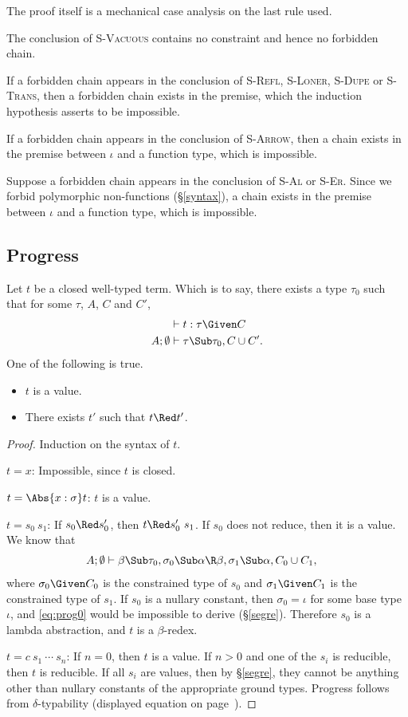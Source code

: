 \documentclass{amsart}
\theoremstyle{definition}
\begin{document}
The proof itself is a mechanical case analysis on the last rule
used.

The conclusion of \textsc{S-Vacuous} contains no constraint and
hence no forbidden chain.

If a forbidden chain appears in the conclusion of \textsc{S-Refl},
\textsc{S-Loner}, \textsc{S-Dupe} or \textsc{S-Trans}, then a
forbidden chain exists in the premise, which the induction
hypothesis asserts to be impossible.

If a forbidden chain appears
in the conclusion of \textsc{S-Arrow}, then a chain exists in the
premise between $\iota$ and a function type, which is impossible.

Suppose a forbidden chain appears in the conclusion of
\textsc{S-Al} or \textsc{S-Er}. Since we forbid polymorphic
non-functions (\S\ref{syntax}), a chain exists in the premise
between $\iota$ and a function type, which is impossible.

\subsection{Progress} Let $t$ be a closed well-typed term. Which
is to say, there exists a type $\tau_0$ such that for some
$\tau$, $A$, $C$ and $C'$,
\begin{align*}
&\vdash t:\tau\Given C\\
A;\emptyset&\vdash \tau\Sub\tau_0,C\cup C'.
\end{align*}
One of the following is true.
\begin{itemize}
\item $t$ is a value.
\item There exists $t'$ such that $t\Red t'$.
\end{itemize}

\begin{proof}
Induction on the syntax of $t$.

\Case$t=x$: Impossible, since $t$ is closed.

\Case$t=\Abs{x:\sigma}t$: $t$ is a value.

\Case$t=s_0~s_1$: If $s_0\Red s_0'$, then $t\Red s_0'~s_1$. If
$s_0$ does not reduce, then it is a value. We know that
\begin{align}
A;\emptyset&\vdash \beta\Sub\tau_0,
\sigma_0\Sub\alpha\R\beta,\sigma_1\Sub\alpha,C_0\cup C_1,
\label{eq:prog0}
\end{align}
where $\sigma_0\Given C_0$ is the constrained type of $s_0$ and
$\sigma_1\Given C_1$ is the constrained type of $s_1$. If $s_0$
is a nullary constant, then $\sigma_0=\iota$ for some base type
$\iota$, and \eqref{eq:prog0} would be impossible to derive
(\S\ref{segre}). Therefore $s_0$ is a lambda abstraction, and $t$
is a $\beta$-redex.

\Case$t=c~s_1~\cdots~s_n$: If $n=0$, then $t$ is a value. If
$n>0$ and one
of the $s_i$ is reducible, then $t$ is reducible. If all $s_i$
are values, then by \S\ref{segre}, they cannot be anything other
than nullary constants of the appropriate ground types. Progress
follows from $\delta$-typability (displayed equation on
page~\pageref{delta-typability}).
\end{proof}


\end{document}
